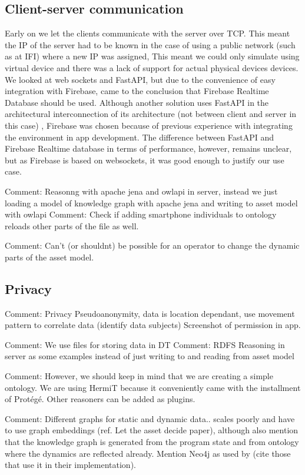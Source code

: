\documentclass{article}
\begin{document}
\subsection{Client-server communication}\label{subsec:ClientServerCommunication}
Early on we let the clients communicate with the server over TCP. This meant the IP of the server had to be known in the case of using a public network (such as at IFI) where a new IP was assigned, This meant we could only simulate using virtual device and there was a lack of support for actual physical devices devices. We looked at web sockets and FastAPI, but due to the convenience of easy integration with Firebase, came to the conclusion that Firebase Realtime Database should be used. Although another solution uses FastAPI in the architectural interconnection of its architecture (not between client and server in this case) \cite{waszak_let_2022}, Firebase was chosen because of previous experience with integrating the environment in app development. The difference between FastAPI and Firebase Realtime database in terms of performance, however, remains unclear, but as Firebase is based on websockets, it was good enough to justify our use case.

Comment: Reasonng with apache jena and owlapi in server, instead we just loading a model of knowledge graph with apache jena and writing to asset model with owlapi
Comment: Check if adding smartphone individuals to ontology reloads other parts of the file as well.

Comment: Can't (or shouldnt) be possible for an operator to change the dynamic parts of the asset model.

\subsection{Privacy}\label{subsec:privacy}
Comment: Privacy
    Pseudoanonymity, data is location dependant, use movement pattern to correlate data (identify data subjects) Screenshot of permission in app.

Comment: We use files for storing data in DT
Comment: RDFS Reasoning in server as some examples instead of just writing to and reading from asset model

Comment: However, we should keep in mind that we are creating a simple ontology. We are using HermiT because it conveniently came with the installment of Protégé. Other reasoners can be added as plugins.

Comment: Different graphs for static and dynamic data.. scales poorly and have to use graph embeddings (ref. Let the asset decide paper), although also mention that the knowledge graph is generated from the program state and from ontology where the dynamics are reflected already. Mention Neo4j as used by (cite those that use it in their implementation).
\end{document}
